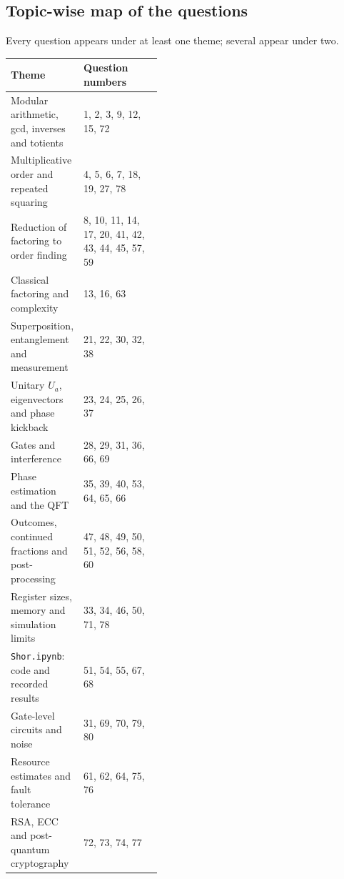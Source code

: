 \documentclass[11pt,a4paper]{article}
\begin{document}
\subsection*{Topic-wise map of the questions}\label{topicmap}
{\small Every question appears under at least one theme; several appear under two.\par}
{\small\renewcommand{\arraystretch}{1.2}
\begin{tabularx}{\linewidth}{@{}>{\raggedright\arraybackslash}p{0.42\linewidth}L@{}}
\toprule
\textbf{Theme} & \textbf{Question numbers}\\ \midrule
Modular arithmetic, gcd, inverses and totients & 1, 2, 3, 9, 12, 15, 72 \\
Multiplicative order and repeated squaring & 4, 5, 6, 7, 18, 19, 27, 78 \\
Reduction of factoring to order finding & 8, 10, 11, 14, 17, 20, 41, 42, 43, 44, 45, 57, 59 \\
Classical factoring and complexity & 13, 16, 63 \\
Superposition, entanglement and measurement & 21, 22, 30, 32, 38 \\
Unitary $U_a$, eigenvectors and phase kickback & 23, 24, 25, 26, 37 \\
Gates and interference & 28, 29, 31, 36, 66, 69 \\
Phase estimation and the QFT & 35, 39, 40, 53, 64, 65, 66 \\
Outcomes, continued fractions and post-processing & 47, 48, 49, 50, 51, 52, 56, 58, 60 \\
Register sizes, memory and simulation limits & 33, 34, 46, 50, 71, 78 \\
\texttt{Shor.ipynb}: code and recorded results & 51, 54, 55, 67, 68 \\
Gate-level circuits and noise & 31, 69, 70, 79, 80 \\
Resource estimates and fault tolerance & 61, 62, 64, 75, 76 \\
RSA, ECC and post-quantum cryptography & 72, 73, 74, 77 \\
\bottomrule
\end{tabularx}}
\end{document}
